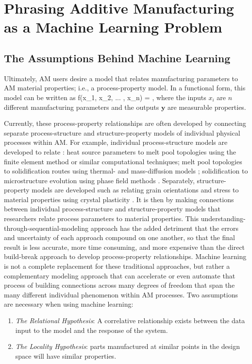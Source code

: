 \section{Phrasing Additive Manufacturing as a Machine Learning Problem}\label{phrasing}

\subsection{The Assumptions Behind Machine Learning}
Ultimately, AM users desire a model that relates manufacturing parameters to AM material properties; i.e., a process-property model. In a functional form, this model can be written as
\eqn
f(x_1, x_2, ... , x_n) = ,
\label{fundamentalgoal}
\equ
where the inputs $x_i$ are $n$ different manufacturing parameters and the outputs $\mathbf{y}$ are measurable properties.

Currently, these process-property relationships are often developed by connecting separate process-structure and structure-property models of individual physical processes within AM.
For example, individual process-structure models are developed to relate : heat source parameters to melt pool topologies \cite{Khairallah2016} using the finite element method or similar computational techniques; melt pool topologies to solidification routes using thermal- and mass-diffusion models  \cite{Tan2011}; solidification to microstructure evolution using phase field methods \cite{Kundin2015}.
Separately, structure-property models are developed such as relating grain orientations and stress to material properties using crystal plasticity \cite{Pal2013, Pal2014}.
It is then by making connections between individual process-structure and structure-property models that researchers relate process parameters to material properties.
This understanding-through-sequential-modeling approach has the added detriment that the errors and uncertainty of each approach compound on one another, so that the final result is less accurate, more time consuming, and more expensive than the direct build-break approach to develop process-property relationships.
Machine learning is not a complete replacement for these traditional approaches, but rather a complementary modeling approach that can accelerate or even automate that process of building connections across many degrees of freedom that span the many different individual phenomenon within AM processes.
Two assumptions are necessary when using machine learning:
\begin{enumerate}
\item \textit{The Relational Hypothesis}: A correlative relationship exists between the data input to the model and the response of the system.
\item \textit{The Locality Hypothesis}:  parts manufactured at similar points in the design space will have similar properties.
\end{enumerate}

